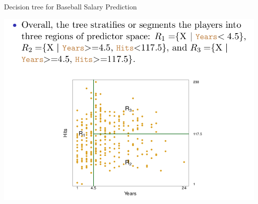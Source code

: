 \documentclass{beamer}
\begin{document}
\begin{frame}{Decision tree for Baseball Salary Prediction}
    \begin{center}
        \includegraphics[scale=0.3]{baseballSal3.png}
    \end{center}
\end{frame}
\end{document}
